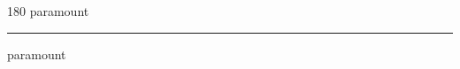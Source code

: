 
\begin{frame}
\begin{center}
\begin{turn}{180}
{\fontsize{2.5cm}{1em}\selectfont paramount}
\end{turn}
\vspace{1em}\par  
\hrule
\vspace{1em}\par  
{\fontsize{2.5cm}{1em}\selectfont paramount}
\end{center}
\end{frame}
